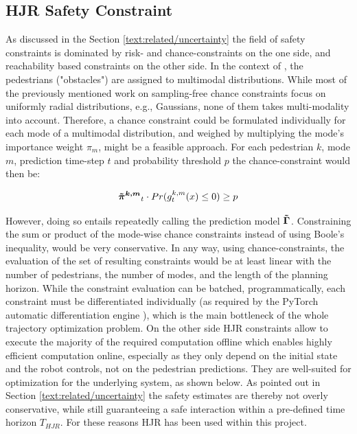 \subsection{HJR Safety Constraint}
\label{text:approach/constraint/safety}
As discussed in the Section \ref{text:related/uncertainty} the field of safety constraints is dominated by risk- and chance-constraints on the one side, and reachability based constraints on the other side.
\newline
In the context of \project, the pedestrians ("obstacles") are assigned to multimodal distributions. While most of the previously mentioned work on sampling-free chance constraints focus on uniformly radial distributions, e.g., Gaussians, none of them takes multi-modality into account. Therefore, a chance constraint could be formulated individually for each mode of a multimodal distribution, and weighed by multiplying the mode's importance weight $\pi_m$, might be a feasible approach. For each pedestrian $k$, mode $m$, prediction time-step $t$ and probability threshold $p$ the chance-constraint would then be:

\begin{equation}
\piped[k,m]_t \cdot Pr(g_t^{k,m}(x)\leq 0) \geq p
\end{equation}

However, doing so entails repeatedly calling the prediction model $\distmodel[]$. Constraining the sum or product of the mode-wise chance constraints instead of using Boole's inequality, would be very conservative. In any way, using chance-constraints, the evaluation of the set of resulting constraints would be at least linear with the number of pedestrians, the number of modes, and the length of the planning horizon. While the constraint evaluation can be batched, programmatically, each constraint must be differentiated individually (as required by the PyTorch automatic differentiation engine \cite{pytorch}), which is the main bottleneck of the whole trajectory optimization problem.
\newline
On the other side \ac{HJR} constraints allow to execute the majority of the required computation offline which enables highly efficient computation online, especially as they only depend on the initial state and the robot controls, not on the pedestrian predictions. They are well-suited for optimization for the underlying system, as shown below. As pointed out in Section \ref{text:related/uncertainty} the safety estimates are thereby not overly conservative, while still guaranteeing a safe interaction within a pre-defined time horizon $T_{HJR}$. For these reasons \ac{HJR} has been used within this project.

